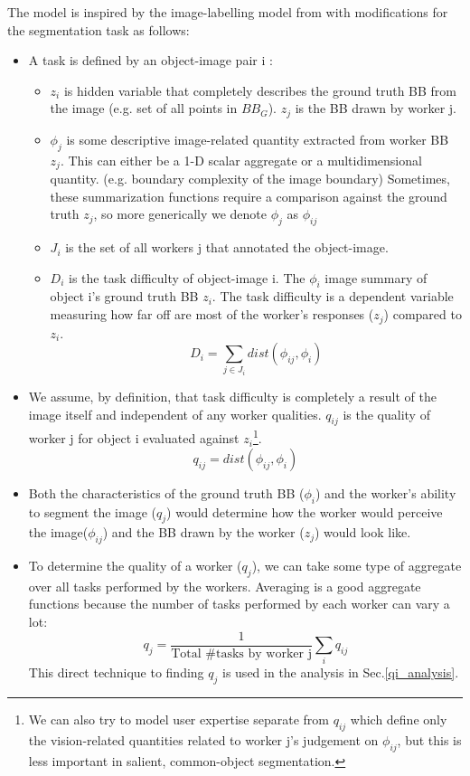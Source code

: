 \documentclass[12pt]{article}
\begin{document}
The model is inspired by the image-labelling model from \cite{MDWWelinder2010} with modifications for the segmentation task as follows:
\begin{itemize}
\item A task is defined by an object-image pair i : 
\begin{itemize}
\item $z_i$ is hidden variable that completely describes the ground truth BB from the image (e.g. set of all points in $BB_G$). $z_j$ is the BB drawn by worker j.
\item  $\phi_j$ is some descriptive image-related quantity extracted from worker BB $z_j$. This can either be a 1-D scalar aggregate or a multidimensional quantity. (e.g. boundary complexity of the image boundary) Sometimes, these summarization functions require a comparison against the ground truth $z_j$, so more generically we denote $\phi_j$ as $\phi_{ij}$
\item $J_i$ is the set of all workers j that annotated the object-image. 
\item $D_i$ is the task difficulty of object-image i. The $\phi_i$ image summary  of object i's ground truth BB $z_i$. The task difficulty is a dependent variable measuring how far off are most of the worker's responses ($z_j$) compared to $z_i$.  
\begin{equation}
D_i = \sum_{j\in J_i} dist(\phi_{ij},\phi_i)
\label{task_difficulty}
\end{equation}
\end{itemize}
\item We assume, by definition, that task difficulty is completely a result of the image itself and independent of any worker qualities. $q_{ij}$ is the quality of worker j for object i evaluated against $z_i$\footnote{We can also try to model user expertise separate from $q_{ij}$ which define only the vision-related quantities related to worker j's judgement on $\phi_{ij}$, but this is less important in salient, common-object segmentation.}.
\begin{equation}
q_{ij} = dist(\phi_{ij},\phi_i)
\label{worker_quality}
\end{equation}
\item Both the characteristics of the ground truth BB ($\phi_i$) and the worker's ability to segment the image ($q_j$) would determine how the worker would perceive the image($\phi_{ij}$) and the BB drawn by the worker ($z_{j}$) would look like.
\item To determine the quality of a worker ($q_j$), we can take some type of aggregate over all tasks performed by the workers. Averaging is a good aggregate functions because the number of tasks performed by each worker can vary a lot:
\begin{equation}
q_j = \frac{1}{\text{Total \# tasks by worker j}}\sum_i q_{ij}
\end{equation}
This direct technique to finding $q_j$ is used in the analysis in Sec.\ref{qi_analysis}.
\end{itemize}
\end{document}
